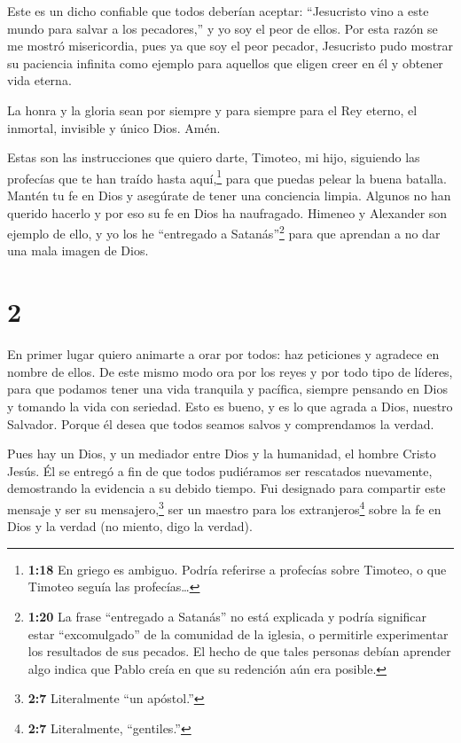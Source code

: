  Este es un dicho confiable que todos deberían aceptar:
``Jesucristo vino a este mundo para salvar a los pecadores,'' y yo soy
el peor de ellos.  Por esta razón se me mostró
misericordia, pues ya que soy el peor pecador, Jesucristo pudo mostrar
su paciencia infinita como ejemplo para aquellos que eligen creer en él
y obtener vida eterna.

 La honra y la gloria sean por siempre y para siempre para
el Rey eterno, el inmortal, invisible y único Dios. Amén.

 Estas son las instrucciones que quiero darte, Timoteo, mi
hijo, siguiendo las profecías que te han traído hasta aquí,\footnote{\textbf{1:18}
  En griego es ambiguo. Podría referirse a profecías sobre Timoteo, o
  que Timoteo seguía las profecías\ldots{}} para que puedas pelear la
buena batalla.  Mantén tu fe en Dios y asegúrate de tener
una conciencia limpia. Algunos no han querido hacerlo y por eso su fe en
Dios ha naufragado.  Himeneo y Alexander son ejemplo de
ello, y yo los he ``entregado a Satanás''\footnote{\textbf{1:20} La
  frase ``entregado a Satanás'' no está explicada y podría significar
  estar ``excomulgado'' de la comunidad de la iglesia, o permitirle
  experimentar los resultados de sus pecados. El hecho de que tales
  personas debían aprender algo indica que Pablo creía en que su
  redención aún era posible.} para que aprendan a no dar una mala imagen
de Dios.

\hypertarget{section-1}{%
\section{2}\label{section-1}}

 En primer lugar quiero animarte a orar por todos: haz
peticiones y agradece en nombre de ellos.  De este mismo
modo ora por los reyes y por todo tipo de líderes, para que podamos
tener una vida tranquila y pacífica, siempre pensando en Dios y tomando
la vida con seriedad.  Esto es bueno, y es lo que agrada a
Dios, nuestro Salvador.  Porque él desea que todos seamos
salvos y comprendamos la verdad.

 Pues hay un Dios, y un mediador entre Dios y la humanidad,
el hombre Cristo Jesús.  Él se entregó a fin de que todos
pudiéramos ser rescatados nuevamente, demostrando la evidencia a su
debido tiempo.  Fui designado para compartir este mensaje y
ser su mensajero,\footnote{\textbf{2:7} Literalmente ``un apóstol.''}
ser un maestro para los extranjeros\footnote{\textbf{2:7} Literalmente,
  ``gentiles.''} sobre la fe en Dios y la verdad (no miento, digo la
verdad).

